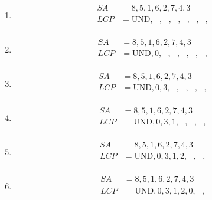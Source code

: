 \begin{enumerate}

    \item \begin{align*}
              SA  & = 8, 5, 1, 6, 2, 7, 4, 3                                                          \\
              LCP & = \text{UND}, \text{ }, \text{ }, \text{ }, \text{ }, \text{ }, \text{ },\text{ } \\
          \end{align*}
    \item \begin{align*}
              SA  & = 8, 5, 1, 6, 2, 7, 4, 3                                                    \\
              LCP & = \text{UND}, 0, \text{ }, \text{ }, \text{ }, \text{ }, \text{ }, \text{ } \\
          \end{align*}
    \item \begin{align*}
              SA  & = 8, 5, 1, 6, 2, 7, 4, 3                                             \\
              LCP & = \text{UND}, 0, 3, \text{ }, \text{ }, \text{ }, \text{ }, \text{ } \\
          \end{align*}
    \item \begin{align*}
              SA  & = 8, 5, 1, 6, 2, 7, 4, 3                                      \\
              LCP & = \text{UND}, 0, 3, 1, \text{ }, \text{ }, \text{ }, \text{ } \\
          \end{align*}
    \item \begin{align*}
              SA  & = 8, 5, 1, 6, 2, 7, 4, 3                               \\
              LCP & = \text{UND}, 0, 3, 1, 2, \text{ }, \text{ }, \text{ } \\
          \end{align*}
    \item \begin{align*}
              SA  & = 8, 5, 1, 6, 2, 7, 4, 3                        \\
              LCP & = \text{UND}, 0, 3, 1, 2, 0, \text{ }, \text{ } \\
          \end{align*}

\end{enumerate}
